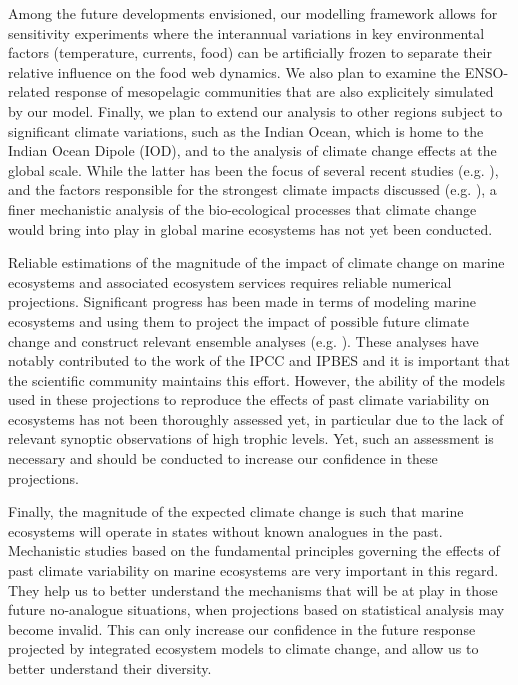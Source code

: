 Among the future developments envisioned, our modelling framework allows for sensitivity experiments where the interannual variations in key environmental factors (temperature, currents, food) can be artificially frozen to separate their relative influence on the food web dynamics. We also plan to examine the ENSO-related response of mesopelagic communities that are also explicitely simulated by our model. Finally, we plan to extend our analysis to other regions subject to significant climate variations, such as the Indian Ocean, which is home to the Indian Ocean Dipole (IOD), and to the analysis of climate change effects at the global scale. While the latter has been the focus of several recent studies (e.g. \citealp{lotzeGlobalEnsembleProjections2019, tittensorNextgenerationEnsembleProjections2021}), and the factors responsible for the strongest climate impacts discussed (e.g. \citealp{heneghanDisentanglingDiverseResponses2021}), a finer mechanistic analysis of the bio-ecological processes that climate change would bring into play in global marine ecosystems has not yet been conducted.

Reliable estimations of the magnitude of the impact of climate change on marine ecosystems and associated ecosystem services requires reliable numerical projections. Significant progress has been made in terms of modeling marine ecosystems and using them to project the impact of possible future climate change and construct relevant ensemble analyses (e.g. \citealp{lotzeGlobalEnsembleProjections2019, tittensorNextgenerationEnsembleProjections2021}). These analyses have notably contributed to the work of the IPCC \citep{portnerIPCCSpecialReport2019, portnerClimateChange20222022} and IPBES \citep{brondizioGlobalAssessmentReport2019} and it is important that the scientific community maintains this effort. However, the ability of the models used in these projections to reproduce the effects of past climate variability on ecosystems has not been thoroughly assessed yet, in particular due to the lack of relevant synoptic observations of high trophic levels. Yet, such an assessment is necessary and should be conducted to increase our confidence in these projections.

Finally, the magnitude of the expected climate change is such that marine ecosystems will operate in states without known analogues in the past. Mechanistic studies based on the fundamental principles governing the effects of past climate variability on marine ecosystems are very important in this regard. They help us to better understand the mechanisms that will be at play in those future no-analogue situations, when projections based on statistical analysis may become invalid. This can only increase our confidence in the future response projected by integrated ecosystem models to climate change, and allow us to better understand their diversity.